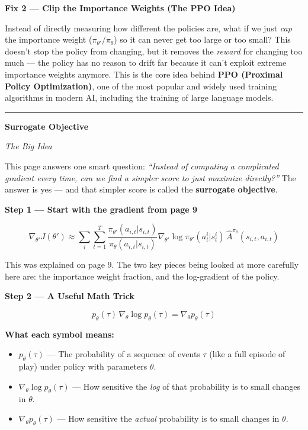 \bigskip

\textbf{Fix 2 --- Clip the Importance Weights (The PPO Idea)}

Instead of directly measuring how different the policies are, what if we just \textit{cap} the
importance weight ($\pi_{\theta'} / \pi_\theta$) so it can never get too large or too small?
This doesn't stop the policy from changing, but it removes the \textit{reward} for changing too
much --- the policy has no reason to drift far because it can't exploit extreme importance weights
anymore. This is the core idea behind \textbf{PPO (Proximal Policy Optimization)}, one of the most
popular and widely used training algorithms in modern AI, including the training of large language
models.

\bigskip
\hrule
\bigskip

\textbf{Surrogate Objective}

\bigskip

\textit{The Big Idea}

This page answers one smart question: \textit{``Instead of computing a complicated gradient every
time, can we find a simpler score to just maximize directly?''} The answer is yes --- and that
simpler score is called the \textbf{surrogate objective}.

\bigskip

\textbf{Step 1 --- Start with the gradient from page 9}

\[
\nabla_{\theta'} J(\theta') \approx \sum_i \sum_{t=1}^{T}
\frac{\pi_{\theta'}(a_{i,t}|s_{i,t})}{\pi_\theta(a_{i,t}|s_{i,t})}
\nabla_{\theta'} \log \pi_{\theta'}(a^i_t|s^i_t)\,
\hat{A}^{\pi_\theta}(s_{i,t}, a_{i,t})
\]

This was explained on page 9. The two key pieces being looked at more carefully here are: the
importance weight fraction, and the log-gradient of the policy.

\bigskip

\textbf{Step 2 --- A Useful Math Trick}

\[
p_\theta(\tau)\, \nabla_\theta \log p_\theta(\tau) = \nabla_\theta p_\theta(\tau)
\]

\textbf{What each symbol means:}
\begin{itemize}
    \item $p_\theta(\tau)$ --- The probability of a sequence of events $\tau$ (like a full episode of play) under policy with parameters $\theta$.
    \item $\nabla_\theta \log p_\theta(\tau)$ --- How sensitive the \textit{log} of that probability is to small changes in $\theta$.
    \item $\nabla_\theta p_\theta(\tau)$ --- How sensitive the \textit{actual} probability is to small changes in $\theta$.
\end{itemize}

